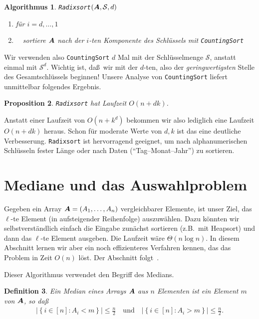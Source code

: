 \documentclass[10pt,reqno]{amsart}
\numberwithin{equation}{section}
\newcommand\cS{\mathcal S}
\newcommand\vA{\vec A}
\def\vec#1{\mathchoice{\mbox{\boldmath$\displaystyle#1$}}
{\mbox{\boldmath$\textstyle#1$}}
{\mbox{\boldmath$\scriptstyle#1$}}
{\mbox{\boldmath$\scriptscriptstyle#1$}}}
\newtheorem{definition}{Definition}[section]
\newtheorem{proposition}[definition]{Proposition}
\newtheorem{algorithm}[definition]{Algorithmus}
\newcommand\cbc[1]{\left\{{#1}\right\}}
\newcommand\abs[1]{\left|{#1}\right|}
\begin{document}
\begin{algorithm}{\tt Radixsort$(\vA,\cS,d)$}
	\begin{enumerate}
		\item f\"ur $i=d,\ldots,1$
		\item $\quad$sortiere $\vA$ nach der $i$-ten Komponente des Schl\"ussels mit {\tt CountingSort}
	\end{enumerate}
\end{algorithm}

Wir verwenden also {\tt CountingSort} $d$ Mal mit der Schl\"usselmenge $\cS$, anstatt einmal mit $\cS^d$.
Wichtig ist, da\ss\ wir mit der $d$-ten, also der {\em geringwertigsten} Stelle des Gesamtschl\"ussels beginnen!
Unsere Analyse von {\tt CountingSort} liefert unmittelbar folgendes Ergebnis.

\begin{proposition}\label{prop_radix}
	{\tt Radixsort} hat Laufzeit $O(n+dk)$.
\end{proposition}

Anstatt einer Laufzeit von $O(n+k^d)$ bekommen wir also lediglich eine Laufzeit $O(n+dk)$ heraus.
Schon f\"ur moderate Werte von $d,k$ ist das eine deutliche Verbesserung.
{\tt Radixsort} ist hervorragend geeignet, um nach alphanumerischen Schl\"usseln fester L\"ange oder nach Daten (``Tag--Monat--Jahr'') zu sortieren.

\section{Mediane und das Auswahlproblem}\label{sec_select}

\noindent
Gegeben ein Array $\vA=(A_1,\ldots,A_n)$ vergleichbarer Elemente, ist unser Ziel, das $\ell$-te Element (in aufsteigender Reihenfolge) auszuw\"ahlen.
Dazu k\"onnten wir selbstverst\"andlich einfach die Eingabe zun\"achst sortieren (z.B.\ mit Heapsort) und dann das $\ell$-te Element ausgeben.
Die Laufzeit w\"are $\Theta(n\log n)$.
In diesem Abschnitt lernen wir aber ein noch effizienteres Verfahren kennen, das das Problem in Zeit $O(n)$ l\"ost.
Der Abschnitt folgt~\cite{Cormen}.

Dieser Algorithmus verwendet den Begriff des Medians.

\begin{definition}\label{def_median}
Ein \emph{Median} eines Arrays $\vA$ aus $n$ Elementen ist ein Element $m$ von $\vA$, so da\ss\
\begin{align*}
	\abs{\cbc{i\in[n]:A_i<m}}\leq\frac n2\quad\mbox{und}\quad\abs{\cbc{i\in[n]:A_i>m}}\leq\frac n2.
\end{align*}
\end{definition}
\end{document}
